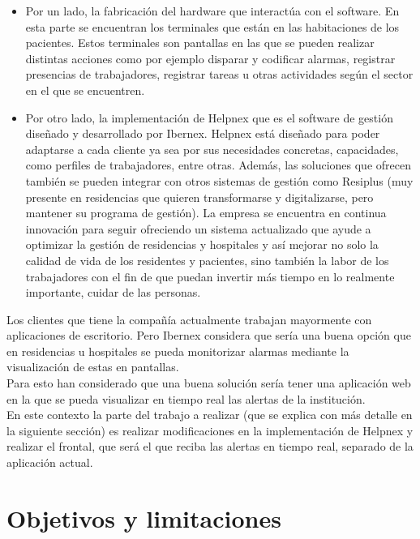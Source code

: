 \begin{itemize}
    \item Por un lado, la fabricación del hardware que interactúa con el software. En esta parte se encuentran los terminales que están en las habitaciones de los pacientes. Estos terminales son pantallas en las que se pueden realizar distintas acciones como por ejemplo disparar y codificar alarmas, registrar presencias de trabajadores, registrar tareas u otras actividades según el sector en el que se encuentren.
    \item Por otro lado, la implementación de Helpnex que es el software de gestión diseñado y desarrollado por Ibernex. Helpnex está diseñado para poder adaptarse a cada cliente ya sea por sus necesidades concretas, capacidades, como perfiles de trabajadores, entre otras.
    Además, las soluciones que ofrecen también se pueden integrar con otros sistemas de gestión como Resiplus (muy presente en residencias que quieren transformarse y digitalizarse, pero mantener su programa de gestión). 
    La empresa se encuentra en continua innovación para seguir ofreciendo un sistema actualizado que ayude a optimizar la gestión de residencias y hospitales y así mejorar no solo la calidad de vida de los residentes y pacientes, sino también la labor de los trabajadores con el fin de que puedan invertir más tiempo en lo realmente importante, cuidar de las personas.
\end{itemize}



Los clientes que tiene la compañía actualmente trabajan mayormente con aplicaciones de escritorio. Pero Ibernex considera que sería una buena opción que en residencias u hospitales se pueda monitorizar alarmas mediante la visualización de estas en pantallas.\\

Para esto han considerado que una buena solución sería tener una aplicación web en la que se pueda visualizar en tiempo real las alertas de la institución.\\

En este contexto la parte del trabajo a realizar (que se explica con más detalle en la siguiente sección) es realizar modificaciones en la implementación de Helpnex y realizar el frontal, que será el que reciba las alertas en tiempo real, separado de la aplicación actual. 


\section{Objetivos y limitaciones}


